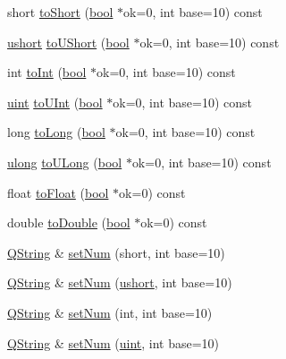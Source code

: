 \begin{DoxyCompactItemize}
\item 
short \hyperlink{class_q_string_ac8354981a33241ba77d5860e7783f039}{to\+Short} (\hyperlink{qglobal_8h_a1062901a7428fdd9c7f180f5e01ea056}{bool} $\ast$ok=0, int base=10) const 
\item 
\hyperlink{qglobal_8h_ab95f123a6c9bcfee6a343170ef8c5f69}{ushort} \hyperlink{class_q_string_a70fcbf0e4fa7fb97cb857c124e26203d}{to\+U\+Short} (\hyperlink{qglobal_8h_a1062901a7428fdd9c7f180f5e01ea056}{bool} $\ast$ok=0, int base=10) const 
\item 
int \hyperlink{class_q_string_ab23a6d28b156505bd46c22a13317327d}{to\+Int} (\hyperlink{qglobal_8h_a1062901a7428fdd9c7f180f5e01ea056}{bool} $\ast$ok=0, int base=10) const 
\item 
\hyperlink{qglobal_8h_a4d3943ddea65db7163a58e6c7e8df95a}{uint} \hyperlink{class_q_string_a30a287b6d9d177102745824f6cdb0a63}{to\+U\+Int} (\hyperlink{qglobal_8h_a1062901a7428fdd9c7f180f5e01ea056}{bool} $\ast$ok=0, int base=10) const 
\item 
long \hyperlink{class_q_string_a920bb6759925d9d6f84bcdc9a4f4b891}{to\+Long} (\hyperlink{qglobal_8h_a1062901a7428fdd9c7f180f5e01ea056}{bool} $\ast$ok=0, int base=10) const 
\item 
\hyperlink{qglobal_8h_a718b4eb2652c286f4d42dc18a8e71a1a}{ulong} \hyperlink{class_q_string_af3eeae60c53040e65b02556ecc166417}{to\+U\+Long} (\hyperlink{qglobal_8h_a1062901a7428fdd9c7f180f5e01ea056}{bool} $\ast$ok=0, int base=10) const 
\item 
float \hyperlink{class_q_string_a57175e7942f534ca2a7d86c029be00d3}{to\+Float} (\hyperlink{qglobal_8h_a1062901a7428fdd9c7f180f5e01ea056}{bool} $\ast$ok=0) const 
\item 
double \hyperlink{class_q_string_ac049aa34946d0e0cf4b78ac7881100d0}{to\+Double} (\hyperlink{qglobal_8h_a1062901a7428fdd9c7f180f5e01ea056}{bool} $\ast$ok=0) const 
\item 
\hyperlink{class_q_string}{Q\+String} \& \hyperlink{class_q_string_accbb06e3141abc70c20ccee59a20b1f5}{set\+Num} (short, int base=10)
\item 
\hyperlink{class_q_string}{Q\+String} \& \hyperlink{class_q_string_a74b4eb9f51f1b59e2fedcb24bb52ceae}{set\+Num} (\hyperlink{qglobal_8h_ab95f123a6c9bcfee6a343170ef8c5f69}{ushort}, int base=10)
\item 
\hyperlink{class_q_string}{Q\+String} \& \hyperlink{class_q_string_ad8a0d9546beed24f51af855a024af9a8}{set\+Num} (int, int base=10)
\item 
\hyperlink{class_q_string}{Q\+String} \& \hyperlink{class_q_string_adc4a9618d3977b917fb7e83135b0a4e9}{set\+Num} (\hyperlink{qglobal_8h_a4d3943ddea65db7163a58e6c7e8df95a}{uint}, int base=10)

\end{DoxyCompactItemize}
